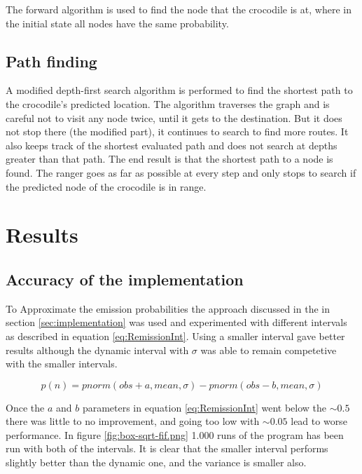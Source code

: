 \documentclass[12pt, a4paper]{article}
\begin{document}
The forward algorithm is used to find the node that the crocodile is at, where in the initial state all nodes have the same probability.

\subsection{Path finding}
A modified depth-first search algorithm is performed to find the shortest path to the crocodile's predicted location. The algorithm traverses the graph and is careful not to visit any node twice, until it gets to the destination. But it does not stop there (the modified part), it continues to search to find more routes. It also keeps track of the shortest evaluated path and does not search at depths greater than that path. The end result is that the shortest path to a node is found. The ranger goes as far as possible at every step and only stops to search if the predicted node of the crocodile is in range.



\section{Results}

\subsection{Accuracy of the implementation}

To Approximate the emission probabilities the approach discussed in the in section \ref{sec:implementation} was used and experimented with different intervals as described in equation \ref{eq:RemissionInt}. Using a smaller interval gave better results although the dynamic interval with $\sigma$ was able to remain competetive with the smaller intervals.

\begin{equation}\label{eq:RemissionInt}
p(n) = pnorm(obs+a,mean,\sigma)-pnorm(obs-b,mean,\sigma)
\end{equation}

Once the $a$ and $b$ parameters in equation \ref{eq:RemissionInt} went below the $\sim0.5$ there was little to no improvement, and going too low with $\sim0.05$ lead to worse performance. In figure \ref{fig:box-sqrt-fif.png} 1.000 runs of the program has been run with both of the intervals. It is clear that the smaller interval performs slightly better than the dynamic one, and the variance is smaller also. 
\end{document}
